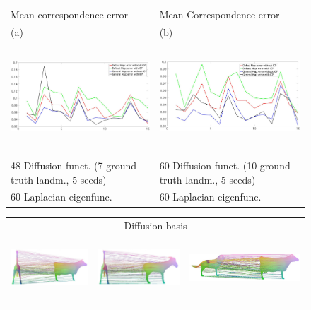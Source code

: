 \documentclass[acmtog,authorversion]{acmart}
\begin{document}
\begin{figure}
\centering
\begin{tabular}{ll}
Mean correspondence error & Mean Correspondence error\\
(a)\includegraphics[height=120pt]{FMAP-images/19-STATISTICS-A.jpg}
&(b)\includegraphics[height=120pt]{FMAP-images/19-STATISTICS-B.jpg}\\
48 Diffusion funct. (7 ground-truth landm., 5 seeds)
&60 Diffusion funct. (10 ground-truth landm., 5 seeds)\\
60 Laplacian eigenfunc.
&60 Laplacian eigenfunc.
\end{tabular}
\begin{tabular}{ccc}
\hline
\multicolumn{3}{c}{Diffusion basis}\\
\includegraphics[height=65pt]{FMAP-images/4legs-Source=381-Target=390-General-Basis-ZOOM.jpg}
&\includegraphics[height=65pt]{FMAP-images/4legs-Source=385-Target=390-General-Basis-ZOOM.jpg}
&\includegraphics[height=50pt]{FMAP-images/4legs-Source=381-Target=398-General-Basis-ZOOM.jpg}\\

\end{tabular}
\end{figure}
\end{document}
